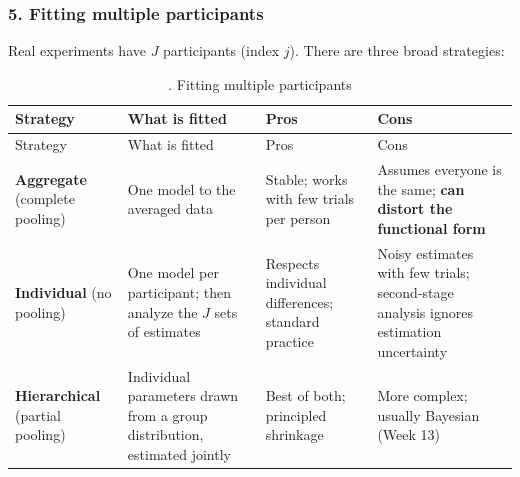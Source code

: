 \subsubsection{5. Fitting multiple participants}

Real experiments have \(J\) participants (index \(j\)). There are three
broad strategies:

\begin{longtable}[]{@{}
  >{\raggedright\arraybackslash}p{}
  >{\raggedright\arraybackslash}p{}
  >{\raggedright\arraybackslash}p{}
  >{\raggedright\arraybackslash}p{}@{}}
\caption{. Fitting multiple participants}\tabularnewline
\toprule\noalign{}
\begin{minipage}[b]{\linewidth}\raggedright
Strategy
\end{minipage} & \begin{minipage}[b]{\linewidth}\raggedright
What is fitted
\end{minipage} & \begin{minipage}[b]{\linewidth}\raggedright
Pros
\end{minipage} & \begin{minipage}[b]{\linewidth}\raggedright
Cons
\end{minipage} \\
\midrule\noalign{}
\endfirsthead
\toprule\noalign{}
\begin{minipage}[b]{\linewidth}\raggedright
Strategy
\end{minipage} & \begin{minipage}[b]{\linewidth}\raggedright
What is fitted
\end{minipage} & \begin{minipage}[b]{\linewidth}\raggedright
Pros
\end{minipage} & \begin{minipage}[b]{\linewidth}\raggedright
Cons
\end{minipage} \\
\midrule\noalign{}
\endhead
\bottomrule\noalign{}
\endlastfoot
\textbf{Aggregate} (complete pooling) & One model to the averaged data &
Stable; works with few trials per person & Assumes everyone is the same;
\textbf{can distort the functional form} \\
\textbf{Individual} (no pooling) & One model per participant; then
analyze the \(J\) sets of estimates & Respects individual differences;
standard practice & Noisy estimates with few trials; second-stage
analysis ignores estimation uncertainty \\
\textbf{Hierarchical} (partial pooling) & Individual parameters drawn
from a group distribution, estimated jointly & Best of both; principled
shrinkage & More complex; usually Bayesian (Week 13) \\
\end{longtable}

